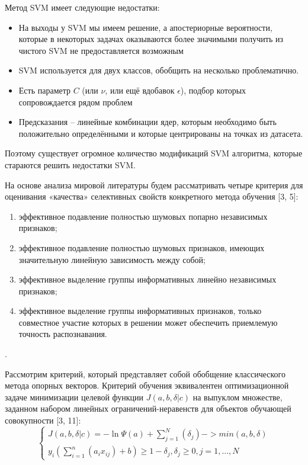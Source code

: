 \documentclass[../body.tex]{subfiles}
\begin{document}
Метод SVM имеет следующие недостатки:
\begin{itemize}
	\item  На выходы у SVM мы имеем решение, а апостериорные вероятности, которые в некоторых задачах оказываются более значимыми получить из чистого SVM не предоставляется возможным
	\item  SVM используется для двух классов, обобщить на несколько
	проблематично.
	\item Есть параметр $C$ (или $\nu$, или ещё вдобавок $\epsilon$), подбор которых сопровождается рядом проблем
	\item Предсказания – линейные комбинации ядер, которым
	необходимо быть положительно определёнными и которые
	центрированы на точках из датасета.
\end{itemize}

Поэтому существует огромное количество модификаций SVM алгоритма, которые стараются решить недостатки SVM.

На основе анализа мировой литературы будем рассматривать четыре критерия для оценивания «качества» селективных свойств конкретного метода обучения [3, 5]:
\begin{enumerate}\label{points}
	\item эффективное подавление полностью шумовых попарно независимых признаков;
	\item эффективное подавление полностью шумовых признаков, имеющих значительную
	линейную зависимость между собой;
	\item  эффективное выделение группы информативных линейно независимых признаков;
	\item эффективное выделение группы информативных признаков, только совместное участие которых в решении может обеспечить приемлемую точность распознавания.
\end{enumerate}.

Рассмотрим критерий, который представляет собой обобщение классического метода опорных векторов.
Критерий обучения эквивалентен оптимизационной задаче минимизации целевой функции $J(a, b, \delta |c)$ на выпуклом множестве, заданном набором линейных ограничений-неравенств для объектов обучающей совокупности [3, 11]: 
\begin{equation}\label{criterion}
	\left\{\begin{matrix}
		J(a, b, \delta |c) = -\ln{\varPsi(a)}+ \sum_{j=1}^{N}(\delta_j)->min(a,b,\delta)
		\\
		y_i(\sum_{i=1}^{n}(a_ix_{ij})+b)\geq1-\delta_j, \delta_j \geq 0, j= 1,...,N 
	\end{matrix}\right.
\end{equation}
\end{document}
